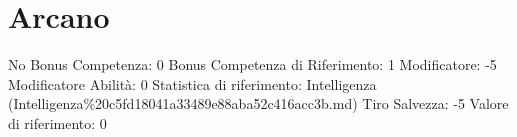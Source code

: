 \section{Arcano}\label{arcano}

\begin{description}
\tightlist
\item[Tags: ABI]
No Bonus Competenza: 0 Bonus Competenza di Riferimento: 1 Modificatore:
-5 Modificatore Abilità: 0 Statistica di riferimento: Intelligenza
(Intelligenza\%20c5fd18041a33489e88aba52c416acc3b.md) Tiro Salvezza: -5
Valore di riferimento: 0
\end{description}
